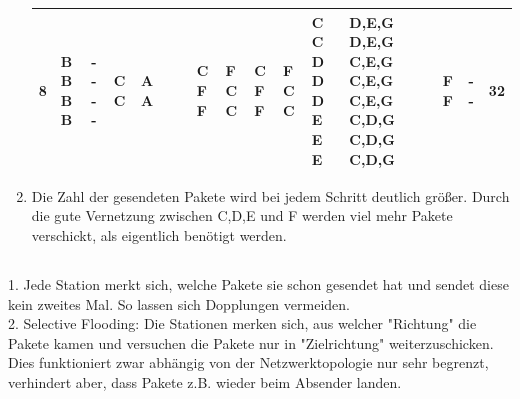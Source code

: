 \documentclass[a4paper,
			llpt,
			solution,
			accentcolor=tud2d,
			colorbacktitle
			]
			{tudexercise}
\newcommand{\8}{$\infty$}
\begin{document}
\begin{enumerate}
\begin{table}[ht]
\begin{tabular}{|c|p{0.7cm}|p{0.7cm}|p{0.7cm}|p{0.7cm}|p{0.7cm}|p{0.8cm}|p{0.8cm}|p{0.8cm}|p{0.8cm}|p{0.7cm}|p{0.7cm}|p{0.7cm}|p{0.7cm}|p{0.7cm}|c|}
8 & B \newline B \newline B \newline B & - \newline - \newline - \newline - & C \newline C  & A \newline A &  &  & C \newline F \newline F & F \newline C \newline C & C \newline F \newline F & F \newline C \newline C & C \newline C \newline D \newline D \newline D \newline E \newline E \newline E & D,E,G \newline D,E,G \newline C,E,G \newline C,E,G \newline C,E,G \newline C,D,G \newline C,D,G \newline C,D,G & F \newline F & - \newline - & 32  \\ \hline
\end{tabular}
\end{table}

\item Die Zahl der gesendeten Pakete wird bei jedem Schritt deutlich größer. Durch die gute Vernetzung zwischen C,D,E und F werden viel mehr Pakete verschickt, als eigentlich benötigt werden.

\end{enumerate}
\subsection{}
      1. Jede Station merkt sich, welche Pakete sie schon gesendet hat und sendet diese kein zweites Mal. So lassen sich Dopplungen vermeiden.\\
      2. Selective Flooding: Die Stationen merken sich, aus welcher "Richtung" die Pakete kamen und versuchen die Pakete nur in "Zielrichtung" weiterzuschicken. Dies funktioniert zwar abhängig von der Netzwerktopologie nur sehr begrenzt, verhindert aber, dass Pakete z.B. wieder beim Absender landen.
\end{document}
